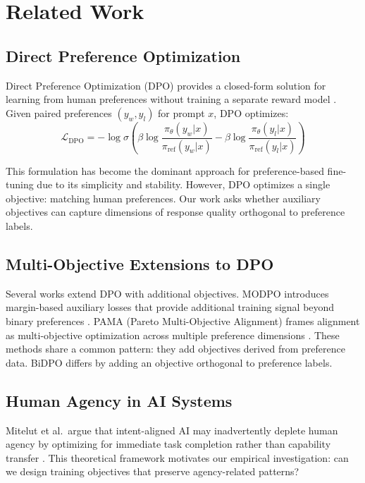 \section{Related Work}

\subsection{Direct Preference Optimization}

Direct Preference Optimization (DPO) provides a closed-form solution for learning from human preferences without training a separate reward model \cite{rafailov2023direct}. Given paired preferences $(y_w, y_l)$ for prompt $x$, DPO optimizes:
\begin{equation}
\mathcal{L}_{\text{DPO}} = -\log \sigma\left(\beta \log \frac{\pi_\theta(y_w|x)}{\pi_{\text{ref}}(y_w|x)} - \beta \log \frac{\pi_\theta(y_l|x)}{\pi_{\text{ref}}(y_l|x)}\right)
\end{equation}

This formulation has become the dominant approach for preference-based fine-tuning due to its simplicity and stability. However, DPO optimizes a single objective: matching human preferences. Our work asks whether auxiliary objectives can capture dimensions of response quality orthogonal to preference labels.

\subsection{Multi-Objective Extensions to DPO}

Several works extend DPO with additional objectives. MODPO introduces margin-based auxiliary losses that provide additional training signal beyond binary preferences \cite{zhou2024modpo}. PAMA (Pareto Multi-Objective Alignment) frames alignment as multi-objective optimization across multiple preference dimensions \cite{he2025pama}. These methods share a common pattern: they add objectives derived from preference data. BiDPO differs by adding an objective orthogonal to preference labels.

\subsection{Human Agency in AI Systems}

Mitelut et al.\ argue that intent-aligned AI may inadvertently deplete human agency by optimizing for immediate task completion rather than capability transfer \cite{mitelut2023intent}. This theoretical framework motivates our empirical investigation: can we design training objectives that preserve agency-related patterns?
